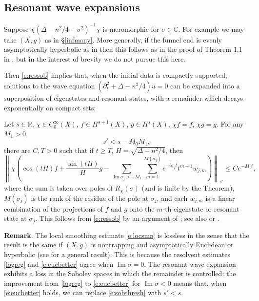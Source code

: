 \documentclass[reqno, 12pt]{amsart}
\newcommand \R {\mathbb{R}}
\newcommand \C {\mathbb{C}}
\DeclareMathOperator \im {Im}
\theoremstyle{definition}
\numberwithin{equation}{section}
\numberwithin{prop}{section}
\numberwithin{figure}{section}
\begin{document}
\subsection{Resonant wave expansions}\label{s:wave} Suppose $\chi (\Delta - n^2/4 - \sigma^2)^{-1} \chi$ is meromorphic for $\sigma \in\C$. For example we may take $(X,g)$ as in \S\ref{infmany}. More generally, if the funnel end is evenly asymptotically hyperbolic as in \cite[Definition 1.2]{g} then this  follows as in the proof of Theorem 1.1 in \cite[p 747]{sz2}, but in the interest of brevity we do not pursue this here.

Then \eqref{e:ressob} implies that, when the initial data is compactly supported,  solutions to the wave equation $(\partial_t^2 + \Delta - n^2/4)u = 0$ can be expanded into a superposition of eigenstates and resonant states, with a remainder which decays exponentially on compact sets:

Let $s \in \R$, $\chi \in C_0^\infty(X)$, $f \in H^{s+1}(X)$, $g \in H^{s}(X)$, $\chi f = f$, $\chi g = g$. For any $M_1>0$,
\begin{equation}\label{e:sobthresh}
s' < s -M_0M_1,
\end{equation}
 there are $C,T>0$ such that if $t \ge T$, $H= \sqrt{\Delta - n^2/4}$, then 
 \[
 \left\|\chi \left(\cos(tH) f + \frac{\sin (tH)}{H} g-   \sum_{\im \sigma_j > -M_1} \sum_{m=1}^{M(\sigma_j)} e^{-i\sigma_j t} t^{m-1} w_{j,m} \right) \right\|_{s'}
  \le C e^{-M_1 t},
\]
where the sum is taken over poles of $R_\chi(\sigma)$ (and is finite by the Theorem),  $M(\sigma_j)$ is the rank of the residue of the pole at $\sigma_j$, and each $w_{j,m}$ is a linear combination of the projections of $f$ and $g$ onto the $m$-th eigenstate or resonant state at $\sigma_j$.
This follows from \eqref{e:ressob} by an argument of \cite{lp,v}; see also \cite[Theorem 3.3]{tz2}  or \cite[Corollary 6.1]{Datchev-Vasy:Gluing}.

\textbf{Remark}. The local smoothing estimate \eqref{e:locsmo} is lossless in the sense that the  result is the same if $(X,g)$ is nontrapping and asymptotically Euclidean or hyperbolic (see \cite[(1.6)]{cpv} for a general result). This is because the resolvent estimates \eqref{logreg} and \eqref{e:eucbetter} agree when $\im \sigma = 0$. The resonant wave expansion exhibits a loss in the Sobolev spaces in which the remainder is controlled: the improvement from \eqref{logreg} to \eqref{e:eucbetter} for $\im \sigma < 0$ means that, when \eqref{e:eucbetter} holds, we can replace \eqref{e:sobthresh} with $s' < s$.
\end{document}
